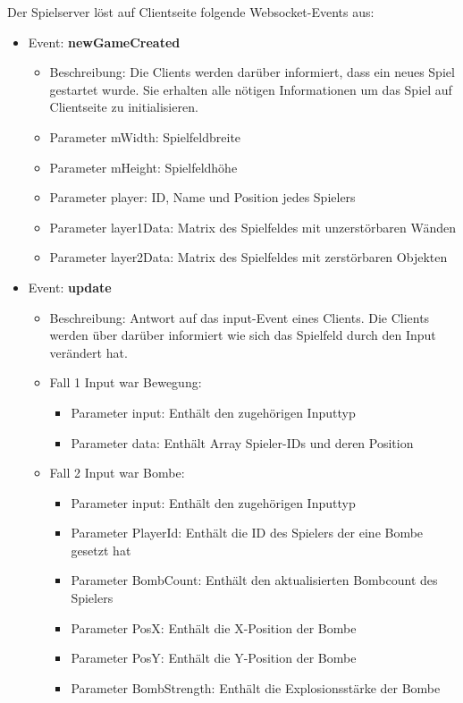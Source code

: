 \documentclass[conference]{IEEEtran}
\begin{document}
\smallskip

Der Spielserver löst auf Clientseite folgende Websocket-Events aus:
\begin{itemize}
\item Event: \textbf{newGameCreated}
\begin{itemize}
\item Beschreibung:
    Die Clients werden darüber informiert, dass ein neues Spiel gestartet wurde. Sie erhalten alle nötigen Informationen um das Spiel auf Clientseite zu initialisieren.
    
\item Parameter \glqq mWidth\grqq{}: Spielfeldbreite
\item Parameter \glqq mHeight\grqq{}: Spielfeldhöhe
\item Parameter \glqq player\grqq{}: ID, Name und Position jedes Spielers
\item Parameter \glqq layer1Data\grqq{}: Matrix des Spielfeldes mit unzerstörbaren Wänden
\item Parameter \glqq layer2Data\grqq{}: Matrix des Spielfeldes mit zerstörbaren Objekten
\end{itemize}

\item Event: \textbf{update}
\begin{itemize}
\item Beschreibung:
    Antwort auf das \glqq input\grqq-Event eines Clients. Die Clients werden über darüber informiert wie sich das Spielfeld durch den Input verändert hat.
    
\item Fall 1 Input war Bewegung:
\begin{itemize}
\item Parameter \glqq input\grqq{}: Enthält den zugehörigen Inputtyp
\item Parameter \glqq data\grqq{}: Enthält Array Spieler-IDs und deren Position
\end{itemize}

\item Fall 2 Input war Bombe:
\begin{itemize}
\item Parameter \glqq input\grqq{}: Enthält den zugehörigen Inputtyp
\item Parameter \glqq PlayerId\grqq{}: Enthält die ID des Spielers der eine Bombe gesetzt hat
\item Parameter \glqq BombCount\grqq{}: Enthält den aktualisierten Bombcount des Spielers
\item Parameter \glqq PosX\grqq{}: Enthält die X-Position der Bombe
\item Parameter \glqq PosY\grqq{}: Enthält die Y-Position der Bombe
\item Parameter \glqq BombStrength\grqq{}: Enthält die Explosionsstärke der Bombe
\end{itemize}
    

\end{itemize}
\end{itemize}
\end{document}
